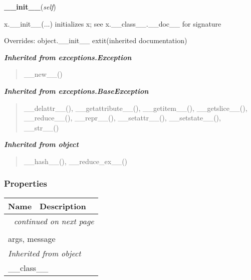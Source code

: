     \vspace{0.5ex}

\hspace{.8\funcindent}\begin{boxedminipage}{\funcwidth}

    \raggedright \textbf{\_\_init\_\_}(\textit{self})

\setlength{\parskip}{2ex}
    x.\_\_init\_\_(...) initializes x; see x.\_\_class\_\_.\_\_doc\_\_ for 
    signature

\setlength{\parskip}{1ex}
      Overrides: object.\_\_init\_\_ 	extit{(inherited documentation)}

    \end{boxedminipage}


\large{\textbf{\textit{Inherited from exceptions.Exception}}}

\begin{quote}
\_\_new\_\_()
\end{quote}

\large{\textbf{\textit{Inherited from exceptions.BaseException}}}

\begin{quote}
\_\_delattr\_\_(), \_\_getattribute\_\_(), \_\_getitem\_\_(), \_\_getslice\_\_(), \_\_reduce\_\_(), \_\_repr\_\_(), \_\_setattr\_\_(), \_\_setstate\_\_(), \_\_str\_\_()
\end{quote}

\large{\textbf{\textit{Inherited from object}}}

\begin{quote}
\_\_hash\_\_(), \_\_reduce\_ex\_\_()
\end{quote}


  \subsubsection{Properties}

    \vspace{-1cm}
\hspace{\varindent}\begin{longtable}{|p{\varnamewidth}|p{\vardescrwidth}|l}
\cline{1-2}
\cline{1-2} \centering \textbf{Name} & \centering \textbf{Description}& \\
\cline{1-2}
\endhead\cline{1-2}\multicolumn{3}{r}{\small\textit{continued on next page}}\\\endfoot\cline{1-2}
\endlastfoot\multicolumn{2}{|l|}{\textit{Inherited from exceptions.BaseException}}\\
\multicolumn{2}{|p{\varwidth}|}{\raggedright args, message}\\
\cline{1-2}
\multicolumn{2}{|l|}{\textit{Inherited from object}}\\
\multicolumn{2}{|p{\varwidth}|}{\raggedright \_\_class\_\_}\\
\cline{1-2}
\end{longtable}

